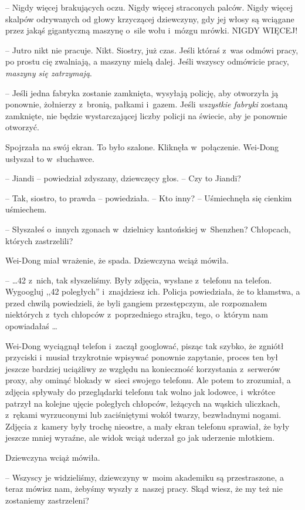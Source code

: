 \documentclass[oneside,polish,11pt,rmheadings]{mwbk}
\begin{document}
-- Nigdy więcej brakujących oczu. Nigdy więcej straconych palców. Nigdy więcej skalpów odrywanych od głowy krzyczącej dziewczyny, gdy jej włosy są wciągane przez jakąś gigantyczną maszynę o~sile wołu i~mózgu mrówki. NIGDY WIĘCEJ!

-- Jutro nikt nie pracuje. Nikt. Siostry, już czas. Jeśli któraś z~was odmówi pracy, po prostu cię zwalniają, a maszyny mielą dalej. Jeśli wszyscy odmówicie pracy, \textit{maszyny się zatrzymają}.

-- Jeśli jedna fabryka zostanie zamknięta, wysyłają policję, aby otworzyła ją ponownie, żołnierzy z~bronią, pałkami i~gazem. Jeśli \textit{wszystkie fabryki }zostaną zamknięte, nie będzie wystarczającej liczby policji na świecie, aby je ponownie otworzyć.

Spojrzała na swój ekran. To było szalone. Kliknęła w~połączenie. Wei-Dong usłyszał to w~słuchawce.

-- Jiandi -- powiedział zdyszany, dziewczęcy głos. -- Czy to Jiandi? 

-- Tak, siostro, to prawda -- powiedziała. -- Kto inny? -- Uśmiechnęła się cienkim uśmiechem.

-- Słyszałeś o~innych zgonach w~dzielnicy kantońskiej w~Shenzhen? Chłopcach, których zastrzelili?

Wei-Dong miał wrażenie, że spada. Dziewczyna wciąż mówiła.

--  \ldots  42 z~nich, tak słyszeliśmy. Były zdjęcia, wysłane z~telefonu na telefon. Wygoogluj ,,42 poległych'' i~znajdziesz ich. Policja powiedziała, że to kłamstwa, a przed chwilą powiedzieli, że byli gangiem przestępczym, ale rozpoznałem niektórych z~tych chłopców z~poprzedniego strajku, tego, o~którym nam opowiadałaś \ldots 

Wei-Dong wyciągnął telefon i~zaczął googlować, pisząc tak szybko, że zgniótł przyciski i~musiał trzykrotnie wpisywać ponownie zapytanie, proces ten był jeszcze bardziej uciążliwy ze względu na konieczność korzystania z~serwerów proxy, aby ominąć blokady w~sieci swojego telefonu. Ale potem to zrozumiał, a zdjęcia spływały do przeglądarki telefonu tak wolno jak lodowce, i~wkrótce patrzył na kolejne ujęcie poległych chłopców, leżących na wąskich uliczkach, z~rękami wyrzuconymi lub zaciśniętymi wokół twarzy, bezwładnymi nogami. Zdjęcia z~kamery były trochę nieostre, a mały ekran telefonu sprawiał, że były jeszcze mniej wyraźne, ale widok wciąż uderzał go jak uderzenie młotkiem.

Dziewczyna wciąż mówiła. 

-- Wszyscy je widzieliśmy, dziewczyny w~moim akademiku są przestraszone, a teraz mówisz nam, żebyśmy wyszły z~naszej pracy. Skąd wiesz, że my też nie zostaniemy zastrzeleni?
\end{document}
